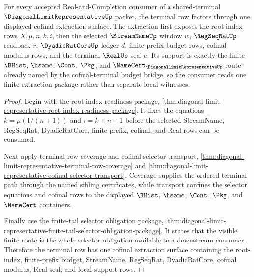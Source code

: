\begin{theorem}
\label{thm:diagonal-limit-representative-terminal-cofinal-extraction}
For every accepted Real-and-Completion consumer of a shared-terminal $\DiagonalLimitRepresentativeUp$ packet, the terminal row factors through one displayed cofinal extraction surface. The extraction first exposes the root-index rows $X,\mu,n,k,i$, then the selected $\StreamNameUp$ window $w$, $\RegSeqRatUp$ readback $r$, $\DyadicRatCoreUp$ ledger $d$, finite-prefix budget rows, cofinal modulus rows, and the terminal $\RealUp$ seal $e$. Its support is exactly the finite $\BHist$, $\hsame$, $\Cont$, $\Pkg$, and $\NameCert_{\DiagonalLimitRepresentativeUp}$ route already named by the cofinal-terminal budget bridge, so the consumer reads one finite extraction package rather than separate local witnesses.
\end{theorem}
\begin{proof}
Begin with the root-index readiness package, \autoref{thm:diagonal-limit-representative-root-index-readiness-package}. It fixes the equations $k=\mu(1/(n+1))$ and $i=k+n+1$ before the selected StreamName, RegSeqRat, DyadicRatCore, finite-prefix, cofinal, and Real rows can be consumed.

Next apply terminal row coverage and cofinal selector transport, \autoref{thm:diagonal-limit-representative-terminal-row-coverage} and \autoref{thm:diagonal-limit-representative-cofinal-selector-transport}. Coverage supplies the ordered terminal path through the named sibling certificates, while transport confines the selector equations and cofinal rows to the displayed $\BHist$, $\hsame$, $\Cont$, $\Pkg$, and $\NameCert$ containers.

Finally use the finite-tail selector obligation package, \autoref{thm:diagonal-limit-representative-finite-tail-selector-obligation-package}. It states that the visible finite route is the whole selector obligation available to a downstream consumer. Therefore the terminal row has one cofinal extraction surface containing the root-index, finite-prefix budget, StreamName, RegSeqRat, DyadicRatCore, cofinal modulus, Real seal, and local support rows.
\end{proof}

